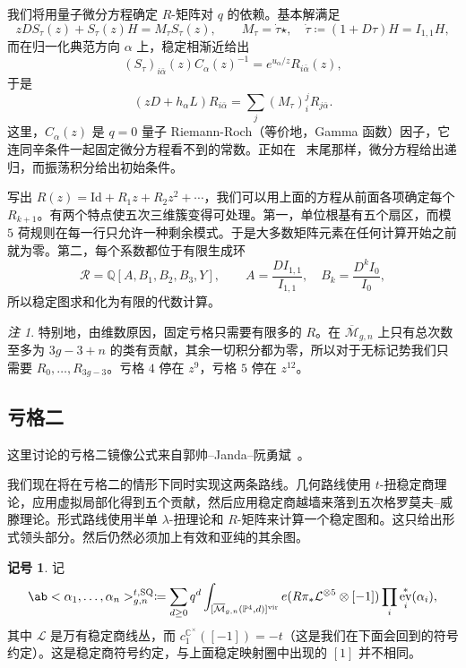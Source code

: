\documentclass{amsart}
\theoremstyle{definition}
\newtheorem{notn}[thm]{记号}
\theoremstyle{remark}
\newtheorem{rmk}[thm]{注}
\theoremstyle{plain}
\theoremstyle{definition}
\theoremstyle{remark}
\newcommand{\C}{\mathbb{C}}
\newcommand{\Q}{\mathbb{Q}}
\renewcommand{\P}{\mathbb{P}}
\newcommand{\Mbar}{\overline{\mathcal{M}}}
\newcommand{\mc}[1]{\mathcal{#1}}
\newcommand{\mr}[1]{\mathrm{#1}}
\newcommand{\1}{\mathbf{1}}
\newcommand{\2}{\mathbf{2}}
\newcommand{\3}{\mathbf{3}}
\newcommand{\vir}{\mr{vir}}
\DeclareMathOperator{\ev}{ev}
\begin{document}
我们将用量子微分方程确定 \(R\)-矩阵对 \(q\) 的依赖。基本解满足
\[ zDS_{\tau}(z) + S_{\tau}(z)H = M_{\tau}S_{\tau}(z), \qquad M_{\tau} = \dot{\tau}\star, \quad \dot{\tau} \coloneqq (1+D\tau)H = I_{1,1}H, \]
而在归一化典范方向 \(\alpha\) 上，稳定相渐近给出
\[ (S_{\tau})_{i\bar{\alpha}}(z)C_{\alpha}(z)^{-1} = e^{u_{\alpha}/z}R_{i\bar{\alpha}}(z), \]
于是
\[ (zD+h_{\alpha}L)R_{i\bar{\alpha}} = \sum_j (M_{\tau})_i^j R_{j\bar{\alpha}}. \]
这里，\(C_{\alpha}(z)\) 是 \(q=0\) 量子 Riemann-Roch（等价地，Gamma 函数）因子，它连同辛条件一起固定微分方程看不到的常数。正如在~ 末尾那样，微分方程给出递归，而振荡积分给出初始条件。

写出 \(R(z) = \mr{Id} + R_1 z + R_2 z^2 + \cdots\)，我们可以用上面的方程从前面各项确定每个 \(R_{k+1}\)。有两个特点使五次三维簇变得可处理。第一，单位根基有五个扇区，而模 \(5\) 荷规则在每一行只允许一种剩余模式。于是大多数矩阵元素在任何计算开始之前就为零。第二，每个系数都位于有限生成环
\[ \mc{R} = \Q[A,B_1,B_2,B_3,Y], \qquad A = \frac{DI_{1,1}}{I_{1,1}}, \quad B_k = \frac{D^k I_0}{I_0}, \]
所以稳定图求和化为有限的代数计算。

\begin{rmk}
    特别地，由维数原因，固定亏格只需要有限多的 \(R\)。在 \(\Mbar_{g,n}\) 上只有总次数至多为 \(3g-3+n\) 的类有贡献，其余一切积分都为零，所以对于无标记势我们只需要 \(R_0, \ldots, R_{3g-3}\)。亏格 \(4\) 停在 \(z^9\)，亏格 \(5\) 停在 \(z^{12}\)。
\end{rmk}
\subsection{亏格二}%
\label{sub:Genus two}

这里讨论的亏格二镜像公式来自郭帅–Janda–阮勇斌~\cite{GJRgenus2}。

我们现在将在亏格二的情形下同时实现这两条路线。几何路线使用 \(t\)-扭稳定商理论，应用虚拟局部化得到五个贡献，然后应用稳定商越墙来落到五次格罗莫夫–威滕理论。形式路线使用半单 \(\lambda\)-扭理论和 \(R\)-矩阵来计算一个稳定图和。这只给出形式领头部分。然后仍然必须加上有效和亚纯的其余图。

\begin{notn}
    记
    \[ \ab<\alpha_1, \ldots, \alpha_n>^{t,\mr{SQ}}_{g,n} \coloneqq \sum_{d\geq0}q^d \int_{[\Mbar_{g,n}(\P^4,d)]^{\vir}}e(R\pi_*\mc{L}^{\otimes 5}\otimes[-1])\prod_i \ev_i^*(\alpha_i), \]
    其中 \(\mc{L}\) 是万有稳定商线丛，而 \(c_1^{\C^{\times}}([-1]) = -t\)（这是我们在下面会回到的符号约定）。这是稳定商符号约定，与上面稳定映射圈中出现的 \([1]\) 并不相同。
\end{notn}
\end{document}
